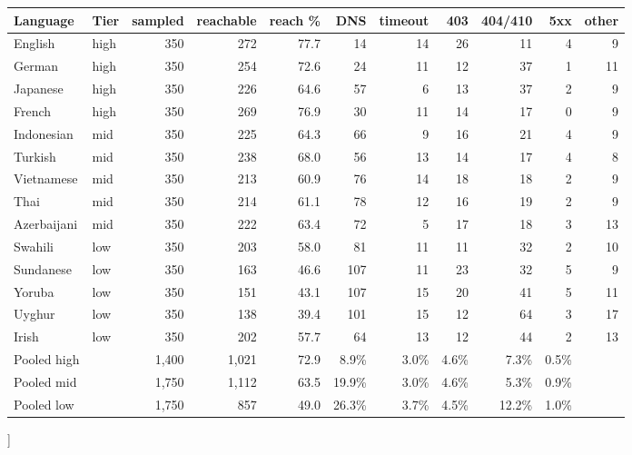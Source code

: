 \documentclass[11pt]{article}
\begin{document}
\vspace{10pt}
\begin{minipage}{\textwidth}
\centering
\footnotesize
\setlength{\tabcolsep}{4pt}
\renewcommand{\arraystretch}{0.88}
\begin{tabular}{llrrrrrrrrr}
\toprule
Language & Tier & sampled & reachable & reach \% & DNS & timeout & 403 & 404/410 & 5xx & other \\
\midrule
English & high & 350 & 272 & 77.7 & 14 & 14 & 26 & 11 & 4 & 9 \\
German & high & 350 & 254 & 72.6 & 24 & 11 & 12 & 37 & 1 & 11 \\
Japanese & high & 350 & 226 & 64.6 & 57 & 6 & 13 & 37 & 2 & 9 \\
French & high & 350 & 269 & 76.9 & 30 & 11 & 14 & 17 & 0 & 9 \\
Indonesian & mid & 350 & 225 & 64.3 & 66 & 9 & 16 & 21 & 4 & 9 \\
Turkish & mid & 350 & 238 & 68.0 & 56 & 13 & 14 & 17 & 4 & 8 \\
Vietnamese & mid & 350 & 213 & 60.9 & 76 & 14 & 18 & 18 & 2 & 9 \\
Thai & mid & 350 & 214 & 61.1 & 78 & 12 & 16 & 19 & 2 & 9 \\
Azerbaijani & mid & 350 & 222 & 63.4 & 72 & 5 & 17 & 18 & 3 & 13 \\
Swahili & low & 350 & 203 & 58.0 & 81 & 11 & 11 & 32 & 2 & 10 \\
Sundanese & low & 350 & 163 & 46.6 & 107 & 11 & 23 & 32 & 5 & 9 \\
Yoruba & low & 350 & 151 & 43.1 & 107 & 15 & 20 & 41 & 5 & 11 \\
Uyghur & low & 350 & 138 & 39.4 & 101 & 15 & 12 & 64 & 3 & 17 \\
Irish & low & 350 & 202 & 57.7 & 64 & 13 & 12 & 44 & 2 & 13 \\
\midrule
Pooled high & & 1,400 & 1,021 & 72.9 & 8.9\% & 3.0\% & 4.6\% & 7.3\% & 0.5\% & \\
Pooled mid & & 1,750 & 1,112 & 63.5 & 19.9\% & 3.0\% & 4.6\% & 5.3\% & 0.9\% & \\
Pooled low & & 1,750 & 857 & 49.0 & 26.3\% & 3.7\% & 4.5\% & 12.2\% & 1.0\% & \\
\bottomrule
\end{tabular}
\label{tab:app-fail}
\end{minipage}

]
\end{document}
